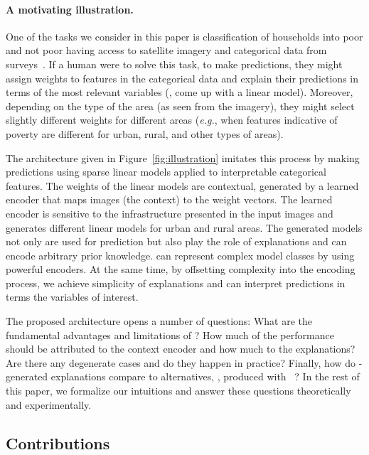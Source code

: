 \documentclass[twoside,11pt]{article}
\begin{document}
\paragraph{A motivating illustration.}
One of the tasks we consider in this paper is classification of households into poor and not poor having access to satellite imagery and categorical data from surveys~\citep{jean2016combining}.
If a human were to solve this task, to make predictions, they might assign weights to features in the categorical data and explain their predictions in terms of the most relevant variables (\ie, come up with a linear model).
Moreover, depending on the type of the area (as seen from the imagery), they might select slightly different weights for different areas (\emph{e.g.}, when features indicative of poverty are different for urban, rural, and other types of areas).

The {\CEN} architecture given in Figure~\ref{fig:illustration} imitates this process by making predictions using sparse linear models applied to interpretable categorical features.
The weights of the linear models are contextual, generated by a learned encoder that maps images (the context) to the weight vectors.
The learned encoder is sensitive to the infrastructure presented in the input images and generates different linear models for urban and rural areas.
The generated models not only are used for prediction but also play the role of explanations and can encode arbitrary prior knowledge.
{\CENs} can represent complex model classes by using powerful encoders.
At the same time, by offsetting complexity into the encoding process, we achieve simplicity of explanations and can interpret predictions in terms the variables of interest.

The proposed architecture opens a number of questions:
What are the fundamental advantages and limitations of {\CEN}?
How much of the performance should be attributed to the context encoder and how much to the explanations?
Are there any degenerate cases and do they happen in practice?
Finally, how do \CEN-generated explanations compare to alternatives, \eg, produced with \LIME~\citep{ribeiro2016trust}?
In the rest of this paper, we formalize our intuitions and answer these questions theoretically and experimentally.

\subsection{Contributions}\label{sec:contributions}
\end{document}

